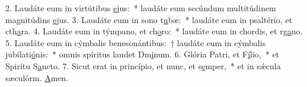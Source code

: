 2. Laudáte eum in virtútibus \uline{e}jus:~* laudáte eum secúndum multitúdinem magnitúdins \uline{e}jus.
3. Laudáte eum in sono t\uline{u}bæ:~* laudáte eum in psaltério, et cth\uline{a}ra.
4. Laudáte eum in týmpano, et ch\uline{o}ro:~* laudáte eum in chordis, et rg\uline{a}no.
5. Laudáte eum in cýmbalis benesonántibus:~† laudáte eum in cýmbalis jubilati\uline{ó}nis:~* omnis spíritus laudet Dm\uline{i}num.
6. Glória Patri, et F\uline{í}lio,~* et Spirítu S\uline{a}ncto.
7. Sicut erat in princípio, et nunc, et s\uline{e}mper,~* et in sǽcula sæculórm. \uline{A}men.
